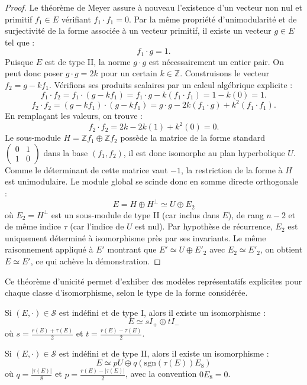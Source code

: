 \begin{proof}
Le théorème de Meyer assure à nouveau l'existence d'un vecteur non nul et primitif $f_1 \in E$ vérifiant $f_1 \cdot f_1 = 0$. Par la même propriété d'unimodularité et de surjectivité de la forme associée à un vecteur primitif, il existe un vecteur $g \in E$ tel que :
\[
f_1 \cdot g = 1.
\]
Puisque $E$ est de type II, la norme $g \cdot g$ est nécessairement un entier pair. On peut donc poser $g \cdot g = 2k$ pour un certain $k \in \mathbb{Z}$. Construisons le vecteur $f_2 = g - k f_1$. Vérifions ses produits scalaires par un calcul algébrique explicite :
\[
f_1 \cdot f_2 = f_1 \cdot (g - k f_1) = f_1 \cdot g - k(f_1 \cdot f_1) = 1 - k(0) = 1.
\]
\[
f_2 \cdot f_2 = (g - k f_1) \cdot (g - k f_1) = g \cdot g - 2k(f_1 \cdot g) + k^2(f_1 \cdot f_1).
\]
En remplaçant les valeurs, on trouve :
\[
f_2 \cdot f_2 = 2k - 2k(1) + k^2(0) = 0.
\]
Le sous-module $H = \mathbb{Z}f_1 \oplus \mathbb{Z}f_2$ possède la matrice de la forme standard $\begin{pmatrix} 0 & 1 \\ 1 & 0 \end{pmatrix}$ dans la base $(f_1, f_2)$, il est donc isomorphe au plan hyperbolique $U$. Comme le déterminant de cette matrice vaut $-1$, la restriction de la forme à $H$ est unimodulaire. Le module global se scinde donc en somme directe orthogonale :
\[
E = H \oplus H^\perp \simeq U \oplus E_2
\]
où $E_2 = H^\perp$ est un sous-module de type II (car inclus dans $E$), de rang $n-2$ et de même indice $\tau$ (car l'indice de $U$ est nul). Par hypothèse de récurrence, $E_2$ est uniquement déterminé à isomorphisme près par ses invariants. Le même raisonnement appliqué à $E'$ montrant que $E' \simeq U \oplus E'_2$ avec $E_2 \simeq E'_2$, on obtient $E \simeq E'$, ce qui achève la démonstration.
\end{proof}

Ce théorème d'unicité permet d'exhiber des modèles représentatifs explicites pour chaque classe d'isomorphisme, selon le type de la forme considérée.

\begin{corollary}
\label{thm:indefI}
Si $(E, \cdot) \in \mathcal{S}$ est indéfini et de type I, alors il existe un isomorphisme :
\[
E \simeq sI_+ \oplus tI_-
\]
où $s = \frac{r(E)+\tau(E)}{2}$ et $t = \frac{r(E)-\tau(E)}{2}$.
\end{corollary}


\begin{corollary}
\label{thm:indefII}
Si $(E, \cdot) \in \mathcal{S}$ est indéfini et de type II, alors il existe un isomorphisme :
\[
E \simeq pU \oplus q (\text{sgn}(\tau(E))E_8)
\]
où $q = \frac{|\tau(E)|}{8}$ et $p = \frac{r(E) - |\tau(E)|}{2}$, avec la convention $0E_8 = 0$.
\end{corollary}




